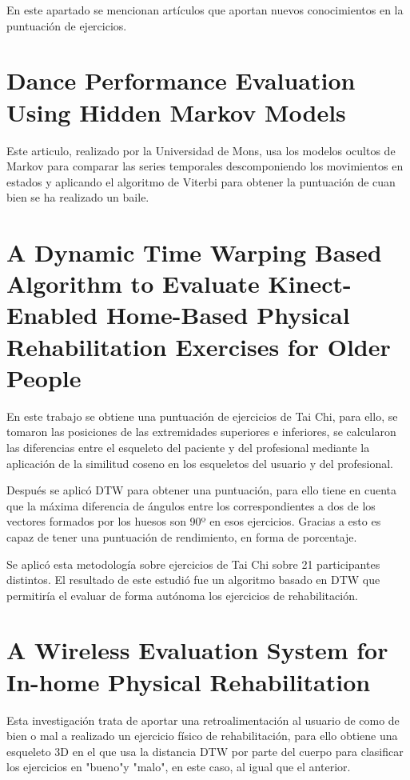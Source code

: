 
En este apartado se mencionan artículos que aportan nuevos conocimientos en la puntuación de ejercicios.

\section{Dance Performance Evaluation Using Hidden Markov Models \cite{danceperf}}
Este articulo, realizado por la Universidad de Mons, usa los modelos ocultos de Markov para comparar las series temporales descomponiendo los movimientos en estados y aplicando el algoritmo de Viterbi para obtener la puntuación de cuan bien se ha realizado un baile.

\section{A Dynamic Time Warping Based Algorithm to Evaluate Kinect-Enabled Home-Based Physical Rehabilitation Exercises for Older People \cite{dtw:formulas2}}
En este trabajo se obtiene una puntuación de ejercicios de Tai Chi, para ello, se tomaron las posiciones de las extremidades superiores e inferiores, se calcularon las diferencias entre el esqueleto del paciente y del profesional mediante la aplicación de la similitud coseno en los esqueletos del usuario y del profesional. 

Después se aplicó DTW para obtener una puntuación, para ello tiene en cuenta que la máxima diferencia de ángulos entre los correspondientes a dos de los vectores formados por los huesos son 90º en esos ejercicios. Gracias a esto es capaz de tener una puntuación de rendimiento, en forma de porcentaje.

Se aplicó esta metodología sobre ejercicios de Tai Chi sobre 21 participantes distintos. El resultado de este estudió fue un algoritmo basado en DTW que permitiría el evaluar de forma autónoma los ejercicios de rehabilitación.

\section{A Wireless Evaluation System for In-home Physical Rehabilitation  \cite{7979089}}
Esta investigación trata de aportar una retroalimentación al usuario de como de bien o mal a realizado un ejercicio físico de rehabilitación, para ello obtiene una esqueleto 3D en el que usa la distancia DTW por parte del cuerpo para clasificar los ejercicios en "bueno"\space y "malo", en este caso, al igual que el anterior. 

